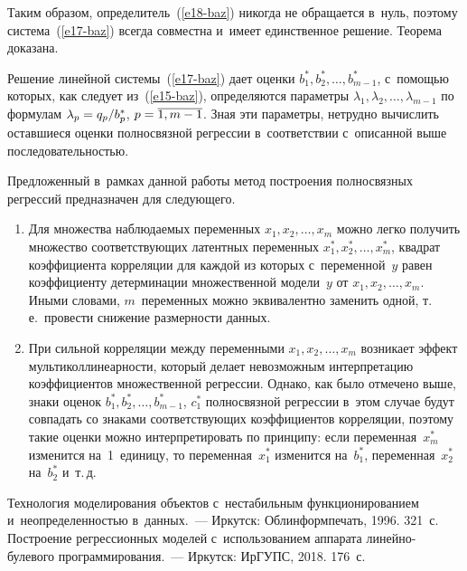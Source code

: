 \begin{multicols}{2}
    Таким образом, определитель~(\ref{e18-baz}) никогда не обращается 
в~нуль, поэтому система~(\ref{e17-baz}) всегда совместна и~имеет 
единственное решение. Теорема доказана.
    
    \smallskip
    
    Решение линейной системы~(\ref{e17-baz}) дает оценки $b_1^*, b_2^*, 
\ldots ,  
b^*_{m-1}$, с~помощью которых, как следует из~(\ref{e15-baz}), определяются 
параметры $\lambda_1, \lambda_2, \ldots , \lambda_{m-1}$ по формулам 
$\lambda_p\hm= q_p/b_p^*$, $p\hm= \overline{1,m-1}$. Зная эти параметры, 
нетрудно вычислить оставшиеся оценки полносвязной регрессии 
в~соответствии с~описанной выше последовательностью.
    
    Предложенный в~рамках данной работы метод построения полносвязных 
регрессий предназначен для следующего.
    \begin{enumerate}[1.]
    \item Для множества наблюдаемых переменных $x_1, x_2, \ldots , x_m$ 
можно легко получить множество соответствующих латентных переменных 
$x_1^*, x_2^*, \ldots , x_m^*$, квадрат коэффициента корреляции для каждой 
из которых с~переменной~$y$\linebreak
 равен коэффициенту детерминации 
множественной модели~$y$ от $x_1, x_2, \ldots , x_m$. Иными словами, 
$m$~переменных можно эквивалентно заменить одной, т.\,е.\ провести 
снижение раз\-мер\-ности данных.
    \item При сильной корреляции между переменными $x_1, x_2, \ldots , x_m$ 
возникает эффект мультиколлинеарности, который делает невозможным 
интерпретацию коэффициентов множественной регрессии. Однако, как было 
отмечено выше, знаки оценок $b_1^*, b_2^*, \ldots , b^*_{m-1}$, $c_1^*$ 
полносвязной регрессии в~этом случае будут совпадать со знаками 
соответствующих коэффициентов корреляции, поэтому такие оценки можно 
интерпретировать по принципу: если переменная~$x_m^*$ изменится 
на~1~единицу, то переменная~$x_1^*$ изменится на~$b_1^*$, 
переменная~$x_2^*$ на~$b_2^*$ и~т.\,д.
    \end{enumerate}
    
{\small\frenchspacing
 {%
 \begin{thebibliography}{99}
    
 Технология моделирования объектов с~нестабильным 
функционированием и~неопределенностью в~данных.~--- Иркутск: Облинформпечать, 
1996. 321~с.
 Построение регрессионных моделей 
с~использованием аппарата линейно-бу\-ле\-во\-го программирования.~--- Иркутск: ИрГУПС, 
2018. 176~с.


\end{thebibliography}}}
\end{multicols}
